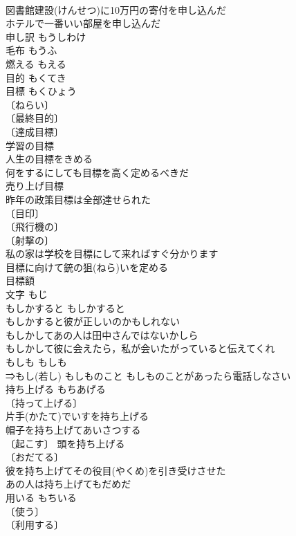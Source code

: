 \documentclass[8pt]{extreport}
\begin{document}
\begin{CJK}{UTF8}{min}
\\	図書館建設(けんせつ)に10万円の寄付を申し込んだ 
\\	ホテルで一番いい部屋を申し込んだ 
\\	申し訳	もうしわけ	
\\	毛布	もうふ	
\\	燃える	もえる	
\\	目的	もくてき	
\\	目標	もくひょう	
\\	〔ねらい〕
\\	〔最終目的〕
\\	〔達成目標〕
\\	学習の目標 
\\	人生の目標をきめる 
\\	何をするにしても目標を高く定めるべきだ 
\\	売り上げ目標 
\\	昨年の政策目標は全部達せられた 
\\	〔目印〕
\\	〔飛行機の〕
\\	〔射撃の〕
\\	私の家は学校を目標にして来ればすぐ分かります 
\\	目標に向けて銃の狙(ねら)いを定める 
\\	目標額 
\\	文字	もじ	
\\	もしかすると	もしかすると	
\\	もしかすると彼が正しいのかもしれない 
\\	もしかしてあの人は田中さんではないかしら 
\\	もしかして彼に会えたら，私が会いたがっていると伝えてくれ 
\\	もしも	もしも	
\\	⇒もし(若し) もしものこと もしものことがあったら電話しなさい 
\\	持ち上げる	もちあげる	
\\	〔持って上げる〕
\\	片手(かたて)でいすを持ち上げる 
\\	帽子を持ち上げてあいさつする 
\\	〔起こす〕 頭を持ち上げる 
\\	〔おだてる〕
\\	彼を持ち上げてその役目(やくめ)を引き受けさせた 
\\	あの人は持ち上げてもだめだ 
\\	用いる	もちいる	
\\	〔使う〕
\\	〔利用する〕

\end{CJK}
\end{document}

